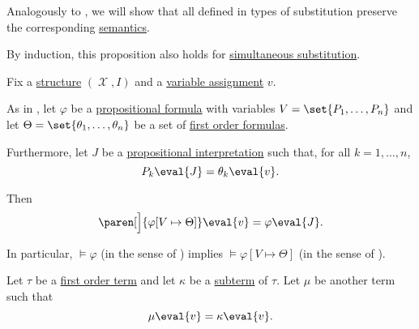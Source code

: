 \begin{proposition}\label{thm:first_order_substitution_equivalence}
  Analogously to , we will show that all defined in  types of substitution preserve the corresponding \hyperref[def:first_order_semantics]{semantics}.

  By induction, this proposition also holds for \hyperref[def:propositional_substitution/simultaneous]{simultaneous substitution}.

  Fix a \hyperref[def:first_order_structure]{structure} \( (\mscrX, I) \) and a \hyperref[def:first_order_valuation/variable_assignment]{variable assignment} \( v \).

  \begin{propenum}
     As in , let \( \varphi \) be a \hyperref[def:propositional_syntax/formula]{propositional formula} with variables \( {V = \set{ P_1, \ldots, P_n }} \) and let \( \Theta = \set{ \theta_1, \ldots, \theta_n } \) be a set of \hyperref[def:first_order_syntax/formula]{first order formulas}.

    Furthermore, let \( J \) be a \hyperref[def:propositional_valuation/interpretation]{propositional interpretation} such that, for all \( k = 1, \ldots, n \),
    \begin{equation}\label{eq:thm:first_order_substitution_equivalence/propositional/compatibility}
      P_k\eval{J} = \theta_k\eval{v}.
    \end{equation}

    Then
    \begin{equation}\label{eq:thm:first_order_substitution_equivalence/propositional}
      \paren[\Big]{ \varphi[V \mapsto \Theta] }\eval{v} = \varphi \eval{J}.
    \end{equation}

    In particular, \( \vDash \varphi \) (in the sense of ) implies \( \vDash \varphi[V \mapsto \Theta] \) (in the sense of ).

     Let \( \tau \) be a \hyperref[def:first_order_syntax/term]{first order term} and let \( \kappa \) be a \hyperref[def:first_order_syntax/subterm]{subterm} of \( \tau \). Let \( \mu \) be another term such that
    \begin{equation}\label{eq:thm:first_order_substitution_equivalence/term_in_term/compatibility}
      \mu\eval{v} = \kappa\eval{v}.
    \end{equation}


\end{propenum}
\end{proposition}

